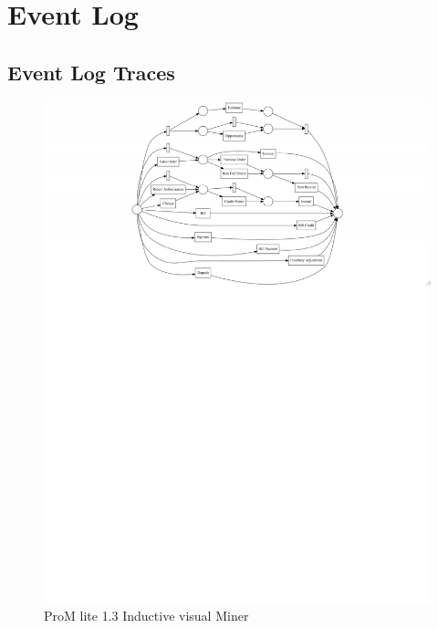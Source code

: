 

\section{Event Log}



\subsection{Event Log Traces}


\begin{figure}[!htb]
        \centering 
    \includegraphics[width =\textwidth, trim =1cm 17cm 0cm 0cm, clip]{resource/problem2.pdf}
    \caption{ProM lite 1.3 Inductive visual Miner}
    \label{figure:eventLogTraces2}

\end{figure}




